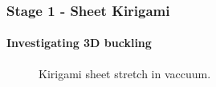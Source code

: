 \documentclass[
	10pt, %
]{beamer}
\begin{document}
\begin{frame}
	\frametitle{Stage 1 - Sheet Kirigami}
	\framesubtitle{Investigating 3D buckling}
	\begin{figure}
		\centering    
		\caption{Kirigami sheet stretch in vaccuum.}
	\end{figure} 
\end{frame}




\end{document}
